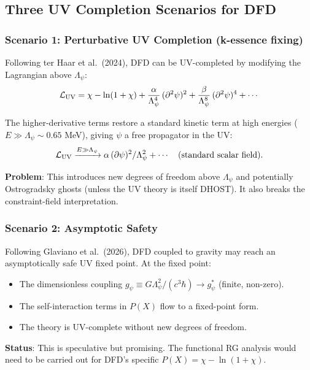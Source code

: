 \documentclass[11pt,a4paper]{article}
\begin{document}
\subsection{Three UV Completion Scenarios for DFD}

\subsubsection{Scenario 1: Perturbative UV Completion (k-essence fixing)}

Following ter Haar et al.\ (2024), DFD can be UV-completed by modifying the Lagrangian above $\Lambda_\psi$:
\begin{equation}
\mathcal{L}_{\rm UV} = \chi - \ln(1+\chi) + \frac{\alpha}{\Lambda_\psi^4}\,(\partial^2\psi)^2 + \frac{\beta}{\Lambda_\psi^8}\,(\partial^2\psi)^4 + \cdots
\end{equation}

The higher-derivative terms restore a standard kinetic term at high energies ($E \gg \Lambda_\psi \sim 0.65$ MeV), giving $\psi$ a free propagator in the UV:
\begin{equation}
\mathcal{L}_{\rm UV} \xrightarrow{E \gg \Lambda_\psi} \alpha\,(\partial\psi)^2/\Lambda_\psi^2 + \cdots \quad\text{(standard scalar field)}.
\end{equation}

\textbf{Problem}: This introduces new degrees of freedom above $\Lambda_\psi$ and potentially Ostrogradsky ghosts (unless the UV theory is itself DHOST). It also breaks the constraint-field interpretation.

\subsubsection{Scenario 2: Asymptotic Safety}

Following Glaviano et al.\ (2026), DFD coupled to gravity may reach an asymptotically safe UV fixed point. At the fixed point:
\begin{itemize}
\item The dimensionless coupling $g_\psi \equiv G\Lambda_\psi^2/(c^3\hbar) \to g_\psi^*$ (finite, non-zero).
\item The self-interaction terms in $P(X)$ flow to a fixed-point form.
\item The theory is UV-complete without new degrees of freedom.
\end{itemize}

\textbf{Status}: This is speculative but promising. The functional RG analysis would need to be carried out for DFD's specific $P(X) = \chi - \ln(1+\chi)$.
\end{document}
